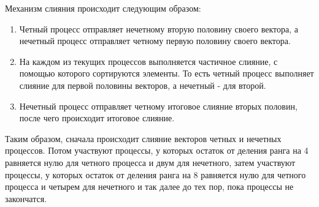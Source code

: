 \documentclass{report}
\begin{document}
Механизм слияния происходит следующим образом:
\begin{enumerate}
\item Четный процесс отправляет нечетному вторую половину своего вектора, а нечетный процесс отправляет четному первую половину своего вектора.
\item На каждом из текущих процессов выполняется частичное слияние, с помощью которого сортируются элементы. То есть четный процесс выполняет слияние для первой половины векторов, а нечетный - для второй.
\item Нечетный процесс отправляет четному итоговое слияние вторых половин, после чего происходит итоговое слияние.
\end{enumerate}

Таким образом, сначала происходит слияние векторов четных и нечетных процессов. Потом участвуют процессы, у которых остаток от деления ранга на 4 равняется нулю для четного процесса и двум для нечетного, затем участвуют процессы, у которых остаток от деления ранга на 8 равняется нулю для четного процесса и четырем для нечетного и так далее до тех пор, пока процессы не закончатся.
\newpage

\end{document}
